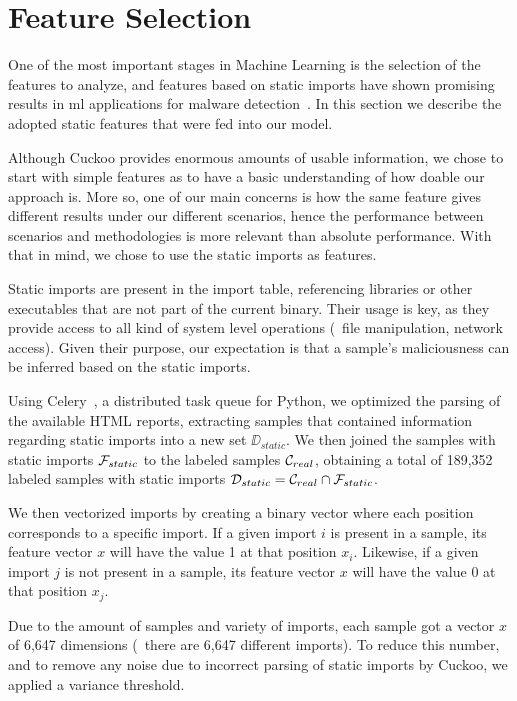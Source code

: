 \section{Feature Selection}
\label{section:feature_selection}

One of the most important stages in Machine Learning is the selection of the features to analyze, and features based on static imports have shown promising results in \gls{ml} applications for malware detection~\cite{miller:rev_int,schultz:data_mining}.
In this section we describe the adopted static features that were fed into our model.

Although Cuckoo provides enormous amounts of usable information, we chose to start with simple features as to have a basic understanding of how doable our approach is.
More so, one of our main concerns is how the same feature gives different results under our different scenarios, hence the performance between scenarios and methodologies is more relevant than absolute performance.
With that in mind, we chose to use the static imports as features.

Static imports are present in the import table, referencing libraries or other executables that are not part of the current binary.
Their usage is key, as they provide access to all kind of system level operations (\eg\ file manipulation, network access). Given their purpose, our expectation is that a sample's maliciousness can be inferred based on the static imports.

Using Celery~\cite{tool:celery}, a distributed task queue for Python, we optimized the parsing of the available HTML reports, extracting samples that contained information regarding static imports into a new set $\DD_{static}$.
We then joined the samples with static imports $\mathcal{F}_{static}$ to the labeled samples $\mathcal{C}_{real}$, obtaining a total of 189,352 labeled samples with static imports $\mathcal{D}_{static} = \mathcal{C}_{real} \cap \mathcal{F}_{static}$.

We then vectorized imports by creating a binary vector where each position corresponds to a specific import.
If a given import $i$ is present in a sample, its feature vector $x$ will have the value 1 at that position $x_i$.
Likewise, if a given import $j$ is not present in a sample, its feature vector $x$ will have the value 0 at that position $x_j$.

Due to the amount of samples and variety of imports, each sample got a vector $x$ of 6,647 dimensions (\ie\ there are 6,647 different imports).
To reduce this number, and to remove any noise due to incorrect parsing of static imports by Cuckoo, we applied a variance threshold.

